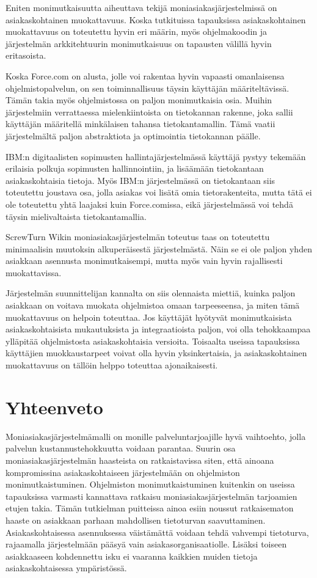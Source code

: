 Eniten monimutkaisuutta aiheuttava tekijä moniasiakasjärjestelmissä on asiakaskohtainen muokattavuus. Koska tutkituissa tapauksissa asiakaskohtainen muokattavuus on toteutettu hyvin eri määrin, myös ohjelmakoodin ja järjestelmän arkkitehtuurin monimutkaisuus on tapausten välillä hyvin eritasoista.

Koska Force.com on alusta, jolle voi rakentaa hyvin vapaasti omanlaisensa ohjelmistopalvelun, on sen toiminnallisuus täysin käyttäjän määriteltävissä. Tämän takia myös ohjelmistossa on paljon monimutkaisia osia. Muihin järjestelmiin verrattaessa mielenkiintoista on tietokannan rakenne, joka sallii käyttäjän määritellä minkälaisen tahansa tietokantamallin. Tämä vaatii järjestelmältä paljon abstraktiota ja optimointia tietokannan päälle.

IBM:n digitaalisten sopimusten hallintajärjestelmässä käyttäjä pystyy tekemään erilaisia polkuja sopimusten hallinnointiin, ja lisäämään tietokantaan asiakaskohtaisia tietoja. Myös IBM:n järjestelmässä on tietokantaan siis toteutettu joustava osa, jolla asiakas voi lisätä omia tietorakenteita, mutta tätä ei ole toteutettu yhtä laajaksi kuin Force.comissa, eikä järjestelmässä voi tehdä täysin mielivaltaista tietokantamallia.

ScrewTurn Wikin moniasiakasjärjestelmän toteutus taas on toteutettu minimaalisin muutoksin alkuperäisestä järjestelmästä. Näin se ei ole paljon yhden asiakkaan asennusta monimutkaisempi, mutta myös vain hyvin rajallisesti muokattavissa.

Järjestelmän suunnittelijan kannalta on siis olennaista miettiä, kuinka paljon asiakkaan on voitava muokata ohjelmistoa omaan tarpeeseensa, ja miten tämä muokattavuus on helpoin toteuttaa. Jos käyttäjät hyötyvät monimutkaisista asiakaskohtaisista mukautuksista ja integraatioista paljon, voi olla tehokkaampaa ylläpitää ohjelmistosta asiakaskohtaisia versioita. Toisaalta useissa tapauksissa käyttäjien muokkaustarpeet voivat olla hyvin yksinkertaisia, ja asiakaskohtainen muokattavuus on tällöin helppo toteuttaa ajonaikaisesti.

\chapter{Yhteenveto}
Moniasiakasjärjestelmämalli on monille palveluntarjoajille hyvä vaihtoehto, jolla palvelun kustannustehokkuutta voidaan parantaa. Suurin osa moniasiakasjärjestelmän haasteista on ratkaistavissa siten, että ainoana kompromissina asiakaskohtaiseen järjestelmään on ohjelmiston monimutkaistuminen. Ohjelmiston monimutkaistuminen kuitenkin on useissa tapauksissa varmasti kannattava ratkaisu moniasiakasjärjestelmän tarjoamien etujen takia. Tämän tutkielman puitteissa ainoa esiin noussut ratkaisematon haaste on asiakkaan parhaan mahdollisen tietoturvan saavuttaminen. Asiakaskohtaisessa asennuksessa väistämättä voidaan tehdä vahvempi tietoturva, rajaamalla järjestelmään pääsyä vain asiakasorganisaatiolle. Lisäksi toiseen asiakkaaseen kohdennettu isku ei vaaranna kaikkien muiden tietoja asiakaskohtaisessa ympäristössä.

